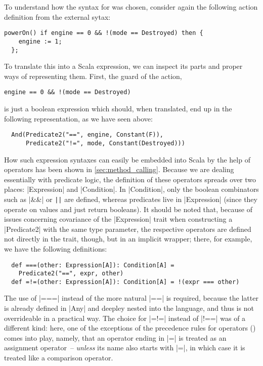 To understand how the syntax for \actium{} was chosen, consider again the following action
definition from the external sytax:
\begin{lstlisting}[language={}]
  powerOn() if engine == 0 && !(mode == Destroyed) then {
    engine := 1; 
  };
\end{lstlisting}
To translate this into a Scala expression, we can inspect its parts and proper ways of representing
them. First, the guard of the action,
\begin{lstlisting}[language={}]
  engine == 0 && !(mode == Destroyed)
\end{lstlisting}
is just a boolean expression which should, when translated, end up in the following 
representation, as we have seen above:
\begin{lstlisting}
  And(Predicate2("==", engine, Constant(F)), 
      Predicate2("!=", mode, Constant(Destroyed)))
\end{lstlisting}
How such expression syntaxes can easily be embedded into Scala by the help of operators has been
shown in \autoref{sec:method_calling}. Because we are dealing essentially with predicate logic, the
definition of these operators spreads over two places: |Expression| and |Condition|. In |Condition|,
only the boolean combinators such as |&&| or \lstinline[style=inline]$||$ are defined, whereas
predicates live in |Expression| (since they operate on values and just return booleans). It should
be noted that, because of issues concerning covariance of the |Expression| trait when constructing a
|Predicate2| with the same type parameter, the respective operators are defined not directly in the
trait, though, but in an implicit wrapper; there, for example, we have the following definitions:
\begin{lstlisting}
  def ===(other: Expression[A]): Condition[A] = 
    Predicate2("==", expr, other)
  def =!=(other: Expression[A]): Condition[A] = !(expr === other)
\end{lstlisting}
The use of |===| instead of the more natural |==| is required, because the latter is already defined
in |Any| and deepley nested into the language, and thus is not overrideable in a practical way. The
choice for |=!=| instead of |!==| was of a different kind: here, one of the exceptions of the
precedence rules for operators () comes into play, namely, that an operator
ending in |=| is treated as an assignment operator~-- \emph{unless} its name also starts with |=|,
in which case it is treated like a comparison operator.

